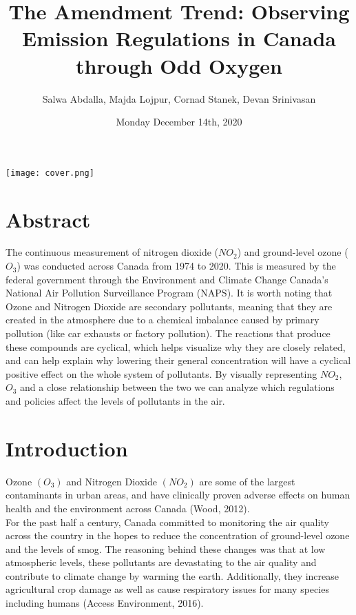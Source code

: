 \documentclass[fontsize=11pt]{article}
\title{The Amendment Trend: Observing Emission Regulations in Canada through Odd Oxygen}
\author{Salwa Abdalla, Majda Lojpur, Cornad Stanek, Devan Srinivasan}
\date{Monday December 14th, 2020}
\begin{document}
\begin{center}
\texttt{[image: cover.png]}
\end{center}
\maketitle

\section*{Abstract}

The continuous measurement of nitrogen dioxide ($NO_2$) and ground-level ozone ($O_3$) was conducted across Canada from 1974 to 2020. This is measured by the federal government through the Environment and Climate Change Canada’s National Air Pollution Surveillance Program (NAPS). It is worth noting that Ozone and Nitrogen Dioxide are secondary pollutants, meaning that they are created in the atmosphere due to a chemical imbalance caused by primary pollution (like car exhausts or factory pollution). The reactions that produce these compounds are cyclical, which helps visualize why they are closely related, and can help explain why lowering their general concentration will have a cyclical positive effect on the whole system of pollutants. By visually representing $NO_2$, $O_3$ and a close relationship between the two we can analyze which regulations and policies affect the levels of pollutants in the air.

\section*{Introduction}

Ozone $(O_3)$ and Nitrogen Dioxide $(NO_2)$ are some of the largest contaminants in urban areas, and have clinically proven adverse effects on human health and the environment across Canada (Wood, 2012). \\

For the past half a century, Canada committed to monitoring the air quality across the country in the hopes to reduce the concentration of ground-level ozone and the levels of smog. The reasoning behind these changes was that at low atmospheric levels, these pollutants are devastating to the air quality and  contribute to climate change by warming the earth. Additionally, they increase agricultural crop damage as well as cause respiratory issues for many species including humans (Access Environment, 2016). \\
\end{document}
